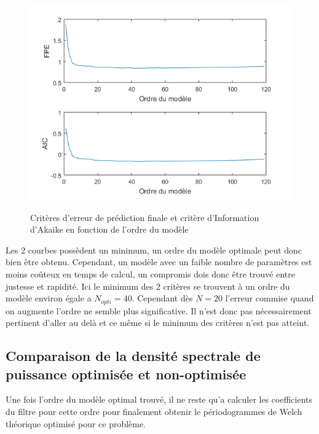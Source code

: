 \documentclass[a4paper]{article}
\begin{document}
\begin{figure}[!h]
	\centering
	\includegraphics[scale=0.7]{criteres.png}
    \label{criteres}
    \caption{Critères d'erreur de prédiction finale et critère d'Information d'Akaike en fonction de l'ordre du modèle}
\end{figure}

Les 2 courbes possèdent un minimum, un ordre du modèle optimale peut donc bien être obtenu. Cependant, un modèle avec un faible nombre de paramètres est moins coûteux en temps de calcul, un compromis dois donc être trouvé entre justesse et rapidité. Ici le minimum des 2 critères se trouvent à un ordre du modèle environ égale a $N_{opti}=40$. Cependant dès $N=20$ l'erreur commise quand on augmente l'ordre ne semble plus significative. Il n'est donc pas nécessairement pertinent d'aller au delà et ce même si le minimum des critères n'est pas atteint.


\subsection{Comparaison de la densité spectrale de puissance optimisée et non-optimisée}
Une fois l'ordre du modèle optimal trouvé, il ne reste qu'a calculer les coefficients du filtre pour cette ordre pour finalement obtenir le périodogrammes de Welch théorique optimisé pour ce problème.
\end{document}
